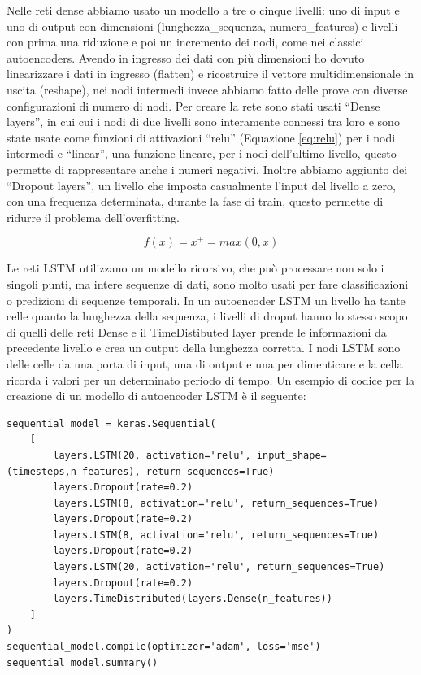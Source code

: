 Nelle reti dense abbiamo usato un modello a tre o cinque livelli: uno di input e uno di output con dimensioni (lunghezza\_sequenza, numero\_features) e livelli con prima una riduzione e poi un incremento dei nodi, come nei classici autoencoders.
Avendo in ingresso dei dati con più dimensioni ho dovuto linearizzare i dati in ingresso (flatten) e ricostruire il vettore multidimensionale in uscita (reshape), nei nodi intermedi invece abbiamo fatto delle prove con diverse configurazioni di numero di nodi.
Per creare la rete sono stati usati ``Dense layers'', in cui cui i nodi di due livelli sono interamente connessi tra loro e sono state usate come funzioni di attivazioni ``relu'' (Equazione \ref{eq:relu}) per i nodi intermedi e ``linear'', una funzione lineare, per i nodi dell'ultimo livello, questo permette di rappresentare anche i numeri negativi.
Inoltre abbiamo aggiunto dei ``Dropout layers'', un livello che imposta casualmente l'input del livello a zero, con una frequenza determinata, durante la fase di train, questo permette di ridurre il problema dell'overfitting.

\begin{equation} \label{eq:relu}
    f(x) = x^+ = max(0, x)
\end{equation}

Le reti LSTM utilizzano un modello ricorsivo, che può processare non solo i singoli punti, ma intere sequenze di dati, sono molto usati per fare classificazioni o predizioni di sequenze temporali.
In un autoencoder LSTM un livello ha tante celle quanto la lunghezza della sequenza, i livelli di droput hanno lo stesso scopo di quelli delle reti Dense e il TimeDistibuted layer prende le informazioni da precedente livello e crea un output della lunghezza corretta.
I nodi LSTM sono delle celle da una porta di input, una di output e una per dimenticare e la cella ricorda i valori per un determinato periodo di tempo.
Un esempio di codice per la creazione di un modello di autoencoder LSTM è il seguente:
\begin{lstlisting}[language=python3, caption={Modello di un autoencoder LSTM}]
sequential_model = keras.Sequential(
    [
        layers.LSTM(20, activation='relu', input_shape=(timesteps,n_features), return_sequences=True)
        layers.Dropout(rate=0.2)
        layers.LSTM(8, activation='relu', return_sequences=True)
        layers.Dropout(rate=0.2)
        layers.LSTM(8, activation='relu', return_sequences=True)
        layers.Dropout(rate=0.2)
        layers.LSTM(20, activation='relu', return_sequences=True)
        layers.Dropout(rate=0.2)
        layers.TimeDistributed(layers.Dense(n_features))
    ]
)
sequential_model.compile(optimizer='adam', loss='mse')
sequential_model.summary()
\end{lstlisting}

